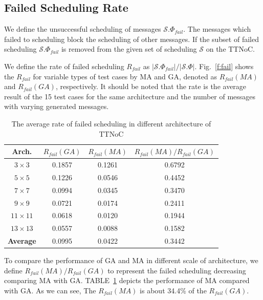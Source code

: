 \documentclass[10pt,journal]{IEEEtran}
\newcommand{\calS}{\mathcal{S}}
\theoremstyle{remark}
\begin{document}
\subsection{Failed Scheduling Rate}
We define the unsuccessful scheduling of messages $\calS.\Phi_{fail}$.
The messages which failed to scheduling block the scheduling of other messages.
If the subset of failed scheduling $\calS.\Phi_{fail}$ is removed from the given set of scheduling $\calS$ on the TTNoC.

We define the rate of failed scheduling $R_{fail}$ as $|\calS.\Phi_{fail}|/|\calS.\Phi|$.
Fig.~\ref{f:fail} shows the $R_{fail}$ for variable types of test cases by MA and GA, denoted as $R_{fail}({MA})$ and $R_{fail}(GA)$, respectively. 
It should be noted that the rate is the average result of the 15 test cases for the same architecture and the number of messages with varying generated messages.
\begin{table}[!t]
	\renewcommand{\arraystretch}{1.3}
	\caption{The average rate of failed scheduling in different architecture of TTNoC}
	\label{t:performance}
	\centering
	\begin{tabular}{|c||c||c||c|}
		\hline
		\textbf{Arch.} & \textbf{$R_{fail}(GA)$} &\textbf{$R_{fail}(MA)$} & 
		\textbf{$R_{fail}(MA)/R_{fail}(GA)$}
		\\
		\hline 
		$3\times 3$&0.1857 &	0.1261 &	0.6792 
		\\
		\hline
		$5\times 5$&0.1226 &	0.0546 &	0.4452 
		\\
		\hline
		$7\times 7$&0.0994 &	0.0345 &	0.3470 
		\\
		\hline	
		$9\times 9$&0.0721 &	0.0174 &	0.2411 
		\\
		\hline
		$11\times 11$&0.0618 &	0.0120 &	0.1944 
		\\
		\hline
		$13\times 13$&0.0557& 	0.0088& 	0.1582 
		\\	
		\hline
		\textbf{Average}&0.0995 &0.0422 &0.3442 
		\\
		\hline
	\end{tabular}	
\end{table}
To compare the performance of GA and MA in different scale of architecture,
we define $R_{fail}(MA)/R_{fail}(GA)$ to represent the failed scheduling decreasing comparing MA with GA.
TABLE~\ref{t:performance} depicts the performance of MA compared with GA.
As we can see, The $R_{fail}(MA)$ is about 34.4\% of the $R_{fail}(GA)$.
\end{document}
